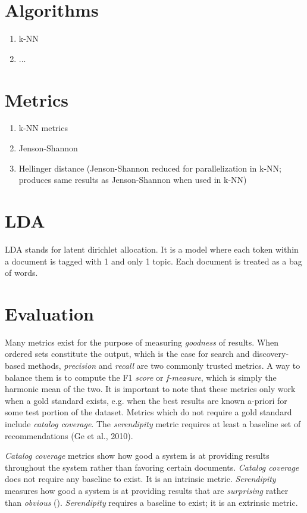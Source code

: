 \section{Algorithms}
\begin{enumerate}
  \item k-NN
  \item ...
\end{enumerate}

\section{Metrics}
\begin{enumerate}
  \item k-NN metrics
  \item Jenson-Shannon
  \item Hellinger distance (Jenson-Shannon reduced for parallelization in k-NN; produces same results as Jenson-Shannon when used in k-NN)
\end{enumerate}

\section{LDA}
LDA stands for latent dirichlet allocation. It is a model where each token within a document is tagged with 1 and only 1 topic. Each document is treated as a bag of words.

\section{Evaluation}

Many metrics exist for the purpose of measuring \textit{goodness} of results. When ordered sets constitute the output, which is the case for search and discovery-based methods, \textit{precision} and \textit{recall} are two commonly trusted metrics. A way to balance them is to compute the F1 \textit{score} or \textit{f-measure}, which is simply the harmonic mean of the two. It is important to note that these metrics only work when a gold standard exists, e.g. when the best results are known a-priori for some test portion of the dataset. Metrics which do not require a gold standard include \textit{catalog coverage}. The \textit{serendipity} metric requires at least a baseline set of recommendations (Ge et al., 2010).

\emph{Catalog coverage} metrics show how good a system is at providing results throughout the system rather than favoring certain documents. \emph{Catalog coverage} does not require any baseline to exist. It is an intrinsic metric. \emph{Serendipity} measures how good a system is at providing results that are \textit{surprising} rather than \textit{obvious} (\citealp{Ge:2010:BAE:1864708.1864761}). \emph{Serendipity} requires a baseline to exist; it is an extrinsic metric. %


